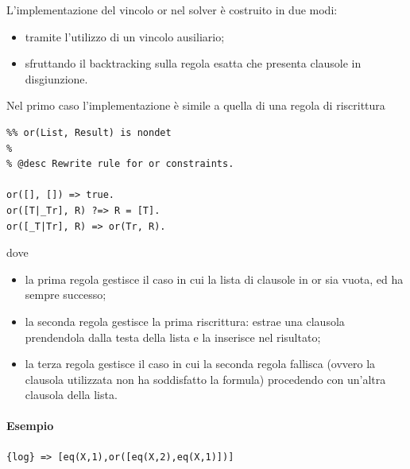 \documentclass[12pt,a4paper,openright]{book} %
\begin{document}
L'implementazione del vincolo or nel solver è costruito in due modi:
\begin{itemize}
	\item tramite l'utilizzo di un vincolo ausiliario;
	\item sfruttando il backtracking sulla regola esatta che
          presenta clausole in disgiunzione.
\end{itemize}

Nel primo caso l'implementazione è simile a quella di una regola di
riscrittura
\begin{verbatim}
%% or(List, Result) is nondet
%
% @desc Rewrite rule for or constraints.

or([], []) => true.
or([T|_Tr], R) ?=> R = [T].
or([_T|Tr], R) => or(Tr, R).
\end{verbatim}
dove
\begin{itemize}
	\item la prima regola gestisce il caso in cui la lista di
          clausole in or sia vuota, ed ha sempre successo;
	\item la seconda regola gestisce la prima riscrittura: estrae
          una clausola prendendola dalla testa della lista e la
          inserisce nel risultato;
	\item la terza regola gestisce il caso in cui la seconda
          regola fallisca (ovvero la clausola utilizzata non ha
          soddisfatto la formula) procedendo con un'altra clausola
          della lista.
\end{itemize}

\paragraph{Esempio}
\begin{verbatim}
{log} => [eq(X,1),or([eq(X,2),eq(X,1)])]
\end{verbatim}
\end{document}
